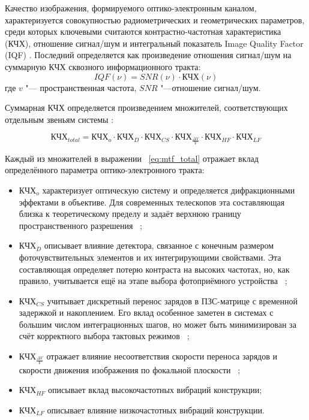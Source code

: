 Качество изображения, формируемого оптико-электронным каналом, характеризуется совокупностью радиометрических и геометрических параметров, среди которых ключевыми считаются контрастно-частотная характеристика (КЧХ), отношение сигнал/шум и интегральный показатель Image Quality Factor (IQF) \cite{leachtenauer1997general}. Последний определяется как произведение отношения сигнал/шум на суммарную КЧХ сквозного информационного тракта:
\begin{equation}
	\label{eq:eq_IQF}
	 IQF(\nu)=SNR(\nu)\cdot \text{КЧХ}(\nu)
\end{equation}
	где \( v \) "--- пространственная частота, \( SNR \) "---отношение сигнал/шум.
	
	
Суммарная КЧХ определяется произведением множителей, соответствующих отдельным звеньям системы \cite{wahballah2018smear}:

\begin{equation}
	\label{eq:mtf_total}
	\text{КЧХ}_{total}=\text{КЧХ}_o\cdot \text{КЧХ}_D \cdot \text{КЧХ}_{CS} \cdot \text{КЧХ}_{\frac{\Delta V}{V}} \cdot \text{КЧХ}_{HF} \cdot \text{КЧХ}_{LF}
	\end{equation}

Каждый из множителей в выражении ~\eqref{eq:mtf_total} отражает вклад определённого параметра оптико-электронного тракта:

\begin{itemize}
	\item \(\text{КЧХ}_o\) характеризует оптическую систему и определяется дифракционными эффектами в объективе. Для современных телескопов эта составляющая близка к теоретическому пределу и задаёт верхнюю границу пространственного разрешения ~\cite{Abolghasemi2012};
	\item \(\text{КЧХ}_D\) описывает влияние детектора, связанное с конечным размером фоточувствительных элементов и их интегрирующими свойствами. Эта составляющая определяет потерю контраста на высоких частотах, но, как правило, учитывается ещё на этапе выбора фотоприёмного устройства ~\cite{Joseph2015};
	\item \(\text{КЧХ}_{CS}\)  учитывает дискретный перенос зарядов в ПЗС-матрице с временной задержкой и накоплением. Его вклад особенное заметен в системах с большим числом интеграционных шагов, но может быть минимизирован за счёт корректного выбора тактовых режимов ~\cite{Wong1992};
	\item \(\text{КЧХ}_{\frac{\Delta V}{V}}\) отражает влияние несоответствия скорости переноса зарядов и скорости движения изображения по фокальной плоскости ~\cite{Wong1992};
	\item \(\text{КЧХ}_{HF}\) описывает вклад высокочастотных вибраций конструкции;
	\item \(\text{КЧХ}_{LF}\) описывает влияние низкочастотных вибраций конструкции.
\end{itemize}

